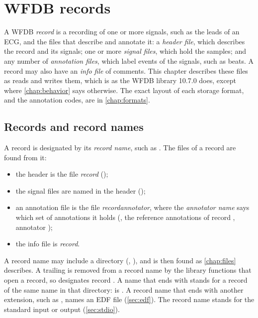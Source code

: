 \chapter{WFDB records}
\label{chap:records}

A WFDB \emph{record} is a recording of one or more signals, such as the
leads of an ECG, and the files that describe and annotate it: a
\emph{header file}, which describes the record and its signals; one or more
\emph{signal files}, which hold the samples; and any number of
\emph{annotation files}, which label events of the signals, such as beats.
A record may also have an \emph{info file} of comments. This chapter
describes these files as \wfdbx{} reads and writes them, which is as the
WFDB library 10.7.0 does, except where \cref{chap:behavior} says otherwise.
The exact layout of each storage format, and the annotation codes, are in
\cref{chap:formats}.

\section{Records and record names}
\label{sec:record-names}

A record is designated by its \emph{record name}, such as . The
files of a record are found from it:
\begin{itemize}
\item the header is the file \emph{record} ();
\item the signal files are named in the header ();
\item an annotation file is the file \emph{record}\emph{annotator},
  where the \emph{annotator name} says which set of annotations it holds
  (, the reference annotations of record ,
  annotator );
\item the info file is \emph{record}.
\end{itemize}

A record name may include a directory (,
), and is then found as \cref{chap:files} describes. A
trailing  is removed from a record name by the library functions
that open a record, so  designates record . A name
that ends with \code{/} stands for a record of the same name in that
directory:  is . A record name that ends
with another extension, such as , names an EDF file
(\cref{sec:edf}). The record name \code{-} stands for the standard input or
output (\cref{sec:stdio}).

